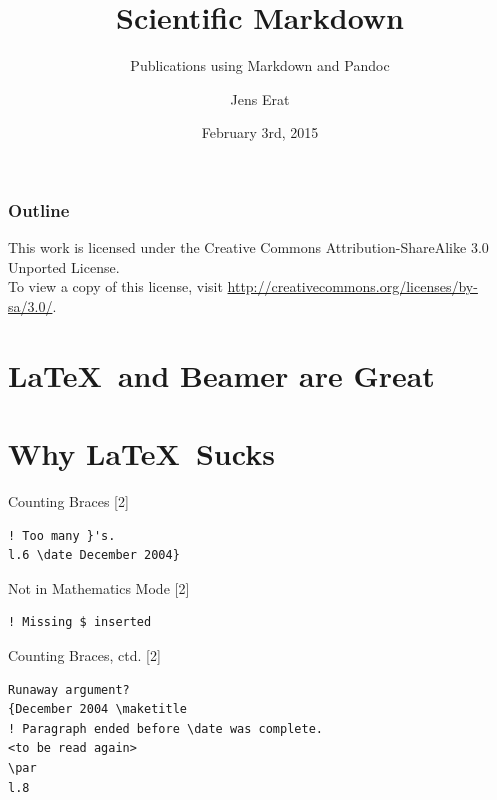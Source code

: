 \documentclass[smaller,ignorenonframetext,]{beamer}
\title{Scientific Markdown}
\subtitle{Publications using Markdown and Pandoc}
\author{Jens Erat}
\date{February 3rd, 2015}
\begin{document}
\frame{\titlepage}


\begin{frame}[t]

\frametitle{Outline}


\tableofcontents[hideallsubsections]

\vspace*{2em}

\begin{center}


\scriptsize This work is licensed under the Creative Commons
Attribution-ShareAlike 3.0 Unported License.\\ To view a copy
of this license, visit
\url{http://creativecommons.org/licenses/by-sa/3.0/}.

\end{center}
\end{frame}

\section{\texorpdfstring{\LaTeX~and Beamer are
Great}{~and Beamer are Great}}\label{and-beamer-are-great}

\section{\texorpdfstring{Why \LaTeX~Sucks}{Why ~Sucks}}\label{why-sucks}

\begin{frame}[fragile]{Counting Braces {[}2{]}}

\begin{lstlisting}
! Too many }'s.
l.6 \date December 2004}
\end{lstlisting}

\end{frame}

\begin{frame}[fragile]{Not in Mathematics Mode {[}2{]}}

\begin{lstlisting}
! Missing $ inserted
\end{lstlisting}

\end{frame}

\begin{frame}[fragile]{Counting Braces, ctd. {[}2{]}}

\begin{lstlisting}
Runaway argument?
{December 2004 \maketitle
! Paragraph ended before \date was complete.
<to be read again>
\par
l.8
\end{lstlisting}

\end{frame}
\end{document}
